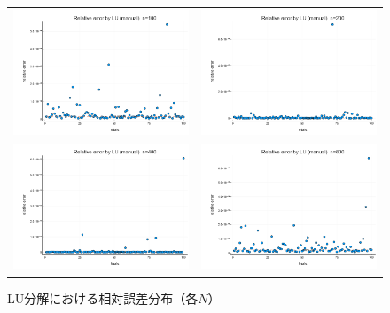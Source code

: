 \documentclass[a4paper,11pt]{ltjsarticle}
\begin{document}
    \begin{figure}[H]
    \centering
    \begin{tabular}{cc}
    \includegraphics[width=72mm]{graphs/exp2_n100_relerr_solution.png} &
    \includegraphics[width=72mm]{graphs/exp2_n200_relerr_solution.png} \\
    \includegraphics[width=72mm]{graphs/exp2_n400_relerr_solution.png} &
    \includegraphics[width=72mm]{graphs/exp2_n800_relerr_solution.png} \\
    \end{tabular}
    \caption{LU分解における相対誤差分布（各$N$）}
    \label{fig:exp2_relerrs}
    \end{figure}
\end{document}
